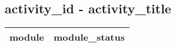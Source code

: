 \documentclass[border=1.75cm]{standalone}
\begin{document}
\begin{minipage}{21cm}
\subsection{ {{ activity_id }} - {{ activity_title }} }
\begin{tabular}{| m{4cm} | m{4cm} |}
\hline
{{ module }} & {{ module_status }} \\ \hline
\end{tabular}
\end{minipage}
\end{document}
